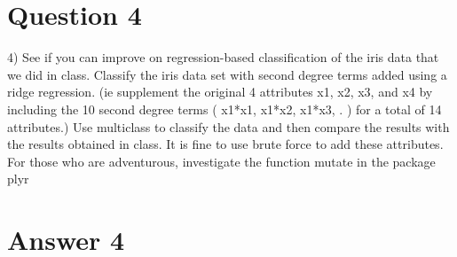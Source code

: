 \documentclass{article}
\begin{document}
\section*{Question 4}

4) See if you can improve on regression-based classification of the iris
data that we did in class. Classify the iris data set with second degree
terms added using a ridge regression. (ie supplement the original 4
attributes x1, x2, x3, and x4 by including the 10 second degree terms (
x1*x1, x1*x2, x1*x3, . ) for a total of 14 attributes.) Use multiclass to
classify the data and then compare the results with the results obtained in
class.
It is fine to use brute force to add these attributes. For those who are
adventurous, investigate the function mutate in the package plyr


\section*{Answer 4}
\end{document}
